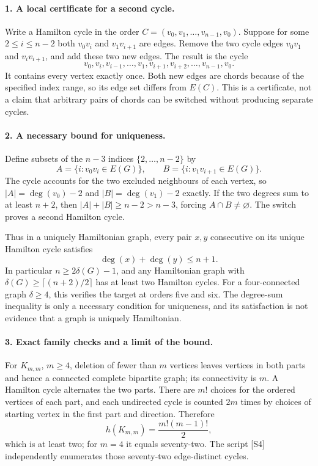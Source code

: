 \documentclass[11pt,a4paper]{article}
\begin{document}
\paragraph{1. A local certificate for a second cycle.}
Write a Hamilton cycle in the order
$C=(v_0,v_1,\ldots,v_{n-1},v_0)$. Suppose for some
$2\le i\le n-2$ both $v_0v_i$ and $v_1v_{i+1}$ are edges.
Remove the two cycle edges $v_0v_1$ and $v_iv_{i+1}$, and add
these two new edges. The result is the cycle
\[
 v_0,v_i,v_{i-1},\ldots,v_1,v_{i+1},v_{i+2},\ldots,v_{n-1},v_0.
\]
It contains every vertex exactly once. Both new edges are chords
because of the specified index range, so its edge set differs from
$E(C)$. This is a certificate, not a claim that arbitrary pairs
of chords can be switched without producing separate cycles.

\paragraph{2. A necessary bound for uniqueness.}
Define subsets of the $n-3$ indices $\{2,\ldots,n-2\}$ by
\[
 A=\{i:v_0v_i\in E(G)\},\qquad
 B=\{i:v_1v_{i+1}\in E(G)\}.
\]
The cycle accounts for the two excluded neighbours of each vertex,
so $|A|=\deg(v_0)-2$ and $|B|=\deg(v_1)-2$ exactly.
If the two degrees sum to at least $n+2$, then
$|A|+|B|\ge n-2>n-3$, forcing $A\cap B\ne\varnothing$.
The switch proves a second Hamilton cycle.

Thus in a uniquely Hamiltonian graph, every pair $x,y$ consecutive
on its unique Hamilton cycle satisfies
\[
 \deg(x)+\deg(y)\le n+1.
\]
In particular $n\ge2\delta(G)-1$, and any Hamiltonian graph with
$\delta(G)\ge\lceil(n+2)/2\rceil$ has at least two Hamilton cycles.
For a four-connected graph $\delta\ge4$, this verifies the target
at orders five and six. The degree-sum inequality is only a necessary
condition for uniqueness, and its satisfaction is not evidence that
a graph is uniquely Hamiltonian.

\paragraph{3. Exact family checks and a limit of the bound.}
For $K_{m,m}$, $m\ge4$, deletion of fewer than $m$ vertices leaves
vertices in both parts and hence a connected complete bipartite graph;
its connectivity is $m$. A Hamilton cycle alternates the two parts.
There are $m!$ choices for the ordered vertices of each part, and
each undirected cycle is counted $2m$ times by choices of starting
vertex in the first part and direction. Therefore
\[
 h(K_{m,m})=\frac{m!(m-1)!}{2},
\]
which is at least two; for $m=4$ it equals seventy-two. The script
[S4] independently enumerates those seventy-two edge-distinct cycles.
\end{document}
